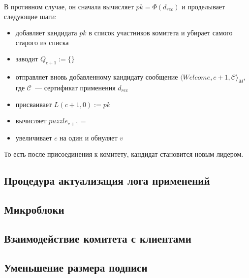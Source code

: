В противном случае, он сначала вычисляет $pk=\Phi(d_{rec})$ и проделывает следующие шаги:
\begin{itemize}
\item добавляет кандидата $pk$ в список участников комитета и убирает самого старого из списка
\item заводит $Q_{c+1} := \{\}$
\item отправляет вновь добавленному кандидату сообщение $\langle Welcome, c+1, \mathcal{C} \rangle_M$, где $\mathcal{C}$~--- сертификат применения $d_{rec}$
\item присваивает $L(c+1, 0):=pk$
\item вычисляет $puzzle_{c+1}=$
\item увеличивает $c$ на один и обнуляет $v$
\end{itemize}

То есть после присоединения к комитету, кандидат становится новым лидером.

\subsection{Процедура актуализация лога применений} \label{act_log}

\subsection{Микроблоки}

\subsection{Взаимодействие комитета с клиентами}

\subsection{Уменьшение размера подписи}
